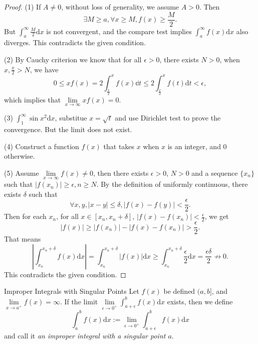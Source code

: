 \begin{proof}
  (1) If $A \neq 0$, without loss of generality, we assume $A > 0$.
  Then
  \begin{equation}
    \exists M \geq a, \forall x \geq M, f(x) \geq \frac{M}{2}.
  \end{equation}
  But $\int_a^{\infty}\frac{M}{2}\mathrm{d} x$ is not convergent,
  and the compare test implies $\int_a^{\infty}f(x)\mathrm{d} x$ also diverges.
  This contradicts the given condition.

  (2) By Cauchy criterion we know that for all $\epsilon > 0$, there exists $N >
  0$, when $x, \frac{x}{2} > N$, we have
  \begin{equation}
    0 \leq xf(x) = 2 \int_{\frac{x}{2}}^x f(x)\mathbb{d} t \leq 2 \int_{\frac{x}{2}}^xf(t)\mathrm{d} t < \epsilon,
  \end{equation}
  which implies that $\lim \limits _{x \rightarrow \infty} xf(x) = 0$.

  (3) $\int_1^{\infty} \sin x^2\mathrm{d} x$, substitue $x = \sqrt{t}$ and use Dirichlet
  test to prove the convergence. But the limit does not exist.

  (4) Construct a function $f(x)$ that takes $x$ when $x$ is an integer, and $0$ otherwise.

  (5) Assume $\lim \limits _{x \rightarrow \infty}f(x) \neq 0$, then there
  exists $\epsilon > 0$, $N > 0$ and a sequence $\{x_n\}$ such that $|f(x_n)| \geq
  \epsilon, n \geq N$.
  By the definition of uniformly continuous, there exists $\delta$ such that
  \begin{equation}
    \forall x, y, |x - y| \leq \delta, |f(x) - f(y)| < \frac{\epsilon}{2}.
  \end{equation}
  Then for each $x_n$, for all $x \in [x_n, x_n + \delta]$,
  $|f(x) - f(x_n)| < \frac{\epsilon}{2}$, we get
  \begin{equation}
    |f(x)| \geq |f(x_n)| - |f(x) - f(x_n)| > \frac{\epsilon}{2}.
  \end{equation}
  That means
  \begin{equation}
    \left| \int_{x_n}^{x_n + \delta} f(x)\mathrm{d} x \right|
    = \int_{x_n}^{x_n + \delta}|f(x)|\mathrm{d} x
    \geq \int_{x_n}^{x_n + \delta} \frac{\epsilon}{2} \mathrm{d} x
     = \frac{\epsilon \delta}{2} \not \rightarrow 0.
  \end{equation}
  This contradicts the given condition.
\end{proof}

\begin{definition}{Improper Integrals with Singular Points}{}
  Let $f(x)$ be defined $(a, b]$,
  and $\lim \limits _{x \rightarrow a^+}f(x) = \infty$.
  If the limit $\lim \limits _{\epsilon \rightarrow 0^+} \int_{a+\epsilon}^b
  f(x) \mathrm{d} x$ exists,
  then we define
  \begin{equation}
    \int_a^b f(x) \mathrm{d} x := \lim \limits _{\epsilon \rightarrow 0^+} \int_{a+\epsilon}^b
  f(x) \mathrm{d} x
  \end{equation}
  and call it \emph{an improper integral with a singular point $a$}.
\end{definition}

